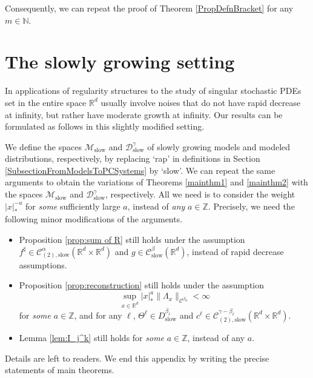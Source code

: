 \documentclass[JEP,XML,SOM,Unicode,published]{cedram}
\theoremstyle{plain}
\theoremstyle{definition}
\newcommand{\slow}{\mathrm{slow}}
\newcommand{\scrM}{\mathscr{M}}
\newcommand{\bbN}{\mathbb{N}}
\newcommand{\bbR}{\mathbb{R}}
\newcommand{\bbZ}{\mathbb{Z}}
\newcommand{\mcC}{\mathcal{C}}
\newcommand{\mcD}{\mathcal{D}}
\begin{document}
Consequently, we can repeat the proof of Theorem \ref{PropDefnBracket} for any $m\in\bbN$.

\section{The slowly growing setting}
\label{AppendixSlow}

In applications of regularity structures to the study of singular stochastic PDEs set in the entire space $\bbR^d$ usually involve noises that do not have rapid decrease at infinity, but rather have moderate growth at infinity. Our results can be formulated as follows in this slightly modified setting.

We define the spaces $\scrM_{\slow}$ and $\mcD_{\slow}^\gamma$ of slowly growing models and modeled distributions, respectively, by replacing `rap' in definitions in Section \ref{SubsectionFromModelsToPCSystems} by `slow'. We can repeat the same arguments to obtain the variations of Theorems \ref{mainthm1} and \ref{mainthm2} with the spaces $\scrM_{\slow}$ and $\mcD_{\slow}^\gamma$, respectively.
All we need is to consider the weight $|x|_*^{-a}$ for {\it some} sufficiently large $a$, instead of {\it any} $a\in\bbZ$.
Precisely, we need the following minor modifications of the arguments.
\begin{itemize}
\item Proposition \ref{prop:sum of R} still holds under the assumption $f^\sharp\in\mcC_{(2),\slow}^\alpha(\bbR^d\times\bbR^d)$ and $g\in\mcC_{\slow}^\beta(\bbR^d)$, instead of rapid decrease assumptions.
\item Proposition \ref{prop:reconstruction} still holds under the assumption
\[
\sup_{x\in\bbR^d}|x|_*^a\|\Lambda_x\|_{\mcC^{\beta_0}}<\infty
\]
for {\it some} $a\in\bbZ$, and for any $\ell$, $\Theta^\ell\in D_{\slow}^{\beta_\ell}$ and $c^\ell\in\mcC_{(2),\slow}^{\gamma-\beta_\ell}(\bbR^d\times\bbR^d)$.
\item Lemma \ref{lem:I_j^k} still holds for {\it some} $a\in\bbZ$, instead of any $a$.
\end{itemize}
Details are left to readers. We end this appendix by writing the precise statements of main theorems.
\end{document}
